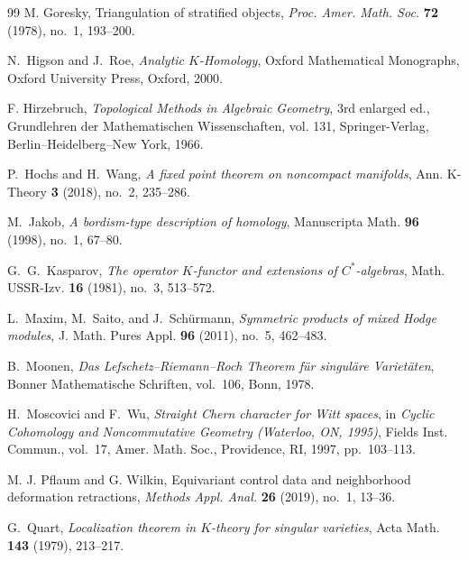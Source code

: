 \documentclass[11pt,leqno,twoside]{amsart}
\theoremstyle{plainsl}
\theoremstyle{definition}
\begin{document}
\begin{thebibliography}{99}
M. Goresky,
Triangulation of stratified objects,
\textit{Proc. Amer. Math. Soc.} \textbf{72} (1978),
no.~1, 193--200.







N.~Higson and J.~Roe,
\emph{Analytic $K$-Homology},
Oxford Mathematical Monographs,
Oxford University Press, Oxford, 2000.

F. Hirzebruch,
\textit{Topological Methods in Algebraic Geometry},
3rd enlarged ed.,
Grundlehren der Mathematischen Wissenschaften, vol. 131,
Springer-Verlag, Berlin--Heidelberg--New York, 1966.


P.~Hochs and H.~Wang,
\emph{A fixed point theorem on noncompact manifolds},
Ann. K-Theory \textbf{3} (2018), no.~2, 235--286.

M.~Jakob,
\emph{A bordism-type description of homology},
Manuscripta Math. \textbf{96} (1998), no.~1, 67--80.

G.~G.~Kasparov,
\emph{The operator $K$-functor and extensions of $C^*$-algebras},
Math. USSR-Izv. \textbf{16} (1981), no.~3, 513--572.


L.~Maxim, M.~Saito, and J.~Sch\"urmann,
\emph{Symmetric products of mixed Hodge modules},
J. Math. Pures Appl. \textbf{96} (2011), no.~5, 462--483.



B.~Moonen,
\emph{Das Lefschetz--Riemann--Roch Theorem f\"ur singul\"are Variet\"aten},
Bonner Mathematische Schriften, vol.~106,
Bonn, 1978.

H.~Moscovici and F.~Wu,
\emph{Straight Chern character for Witt spaces},
in \emph{Cyclic Cohomology and Noncommutative Geometry
(Waterloo, ON, 1995)},
Fields Inst. Commun., vol.~17,
Amer. Math. Soc., Providence, RI, 1997, pp.~103--113.





M. J. Pflaum and G. Wilkin,
Equivariant control data and neighborhood deformation retractions,
\textit{Methods Appl. Anal.} \textbf{26} (2019),
no.~1, 13--36.








G.~Quart,
\emph{Localization theorem in $K$-theory for singular varieties},
Acta Math. \textbf{143} (1979), 213--217.


\end{thebibliography}
\end{document}
